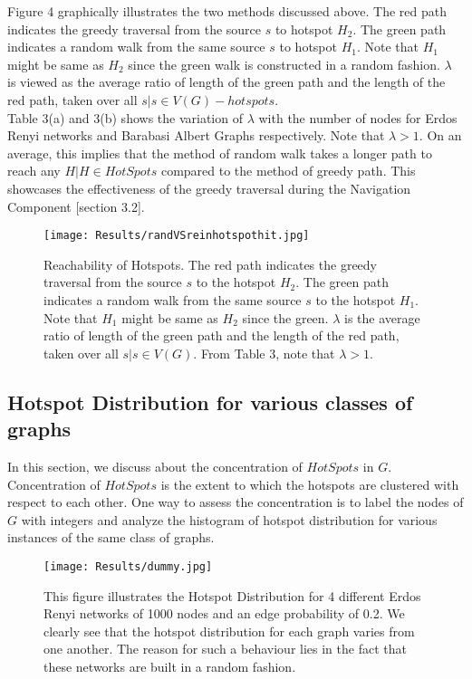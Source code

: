 \documentclass{article}
\begin{document}
Figure 4 graphically illustrates the two methods discussed above. The red path indicates the greedy traversal from the source $s$ to hotspot $H_2$. The green path indicates a random walk from the same source $s$ to hotspot $H_1$. Note that $H_1$ might be same as $H_2$ since the green walk is constructed in a random fashion. $\lambda$ is viewed as the average ratio of length of the green path and the length of the red path, taken over all $s | s \in V(G) - hotspots$.\\

Table 3(a) and 3(b) shows the variation of $\lambda$ with the number of nodes for Erdos Renyi networks and Barabasi Albert Graphs respectively. Note that $\lambda > 1$. On an average, this implies that the method of random walk takes a longer path to reach any $H | H \in HotSpots$ compared to the method of greedy path. This showcases the effectiveness of the greedy traversal during the Navigation Component [section 3.2].

\begin{figure}[htp]
\centering
\texttt{[image: Results/randVSreinhotspothit.jpg]}
\caption{Reachability of Hotspots. The red path indicates the greedy traversal from the source $s$ to the hotspot $H_2$. The green path indicates a random walk from the same source $s$ to the hotspot $H_1$. Note that $H_1$ might be same as $H_2$ since the green. $\lambda$ is the average ratio of length of the green path and the length of the red path, taken over all $s | s \in V(G)$. From Table 3, note that $\lambda>1$.}
\label{}
\end{figure}

\subsection{Hotspot Distribution for various classes of graphs}

In this section, we discuss about the concentration of $HotSpots$ in $G$. Concentration of $HotSpots$ is the extent to which the hotspots are clustered with respect to each other. One way to assess the concentration is to label the nodes of $G$ with integers and analyze the histogram of hotspot distribution for various instances of the same class of graphs.\\

\newpage

\begin{figure}[htp]
\centering
\texttt{[image: Results/dummy.jpg]}
\caption{This figure illustrates the Hotspot Distribution for 4 different Erdos Renyi networks of 1000 nodes and an edge probability of 0.2. We clearly see that the hotspot distribution for each graph varies from one another. The reason for such a behaviour lies in the fact that these networks are built in  a random fashion.}
\label{}
\end{figure}
\end{document}
